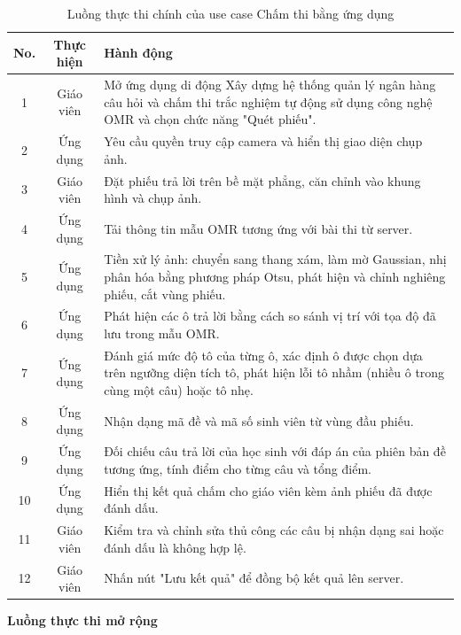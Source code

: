 ﻿\documentclass[../DoAn.tex]{subfiles}
\begin{document}
\begin{table}[H]
\centering
\begin{tabular}{|c|c|p{9cm}|}
\hline
\textbf{No.} & \textbf{Thực hiện} & \textbf{Hành động} \\ \hline
1 & Giáo viên & Mở ứng dụng di động Xây dựng hệ thống quản lý ngân hàng câu hỏi và chấm thi trắc nghiệm tự động sử dụng công nghệ OMR và chọn chức năng "Quét phiếu". \\ \hline
2 & Ứng dụng & Yêu cầu quyền truy cập camera và hiển thị giao diện chụp ảnh. \\ \hline
3 & Giáo viên & Đặt phiếu trả lời trên bề mặt phẳng, căn chỉnh vào khung hình và chụp ảnh. \\ \hline
4 & Ứng dụng & Tải thông tin mẫu OMR tương ứng với bài thi từ server. \\ \hline
5 & Ứng dụng & Tiền xử lý ảnh: chuyển sang thang xám, làm mờ Gaussian, nhị phân hóa bằng phương pháp Otsu, phát hiện và chỉnh nghiêng phiếu, cắt vùng phiếu. \\ \hline
6 & Ứng dụng & Phát hiện các ô trả lời bằng cách so sánh vị trí với tọa độ đã lưu trong mẫu OMR. \\ \hline
7 & Ứng dụng & Đánh giá mức độ tô của từng ô, xác định ô được chọn dựa trên ngưỡng diện tích tô, phát hiện lỗi tô nhầm (nhiều ô trong cùng một câu) hoặc tô nhẹ. \\ \hline
8 & Ứng dụng & Nhận dạng mã đề và mã số sinh viên từ vùng đầu phiếu. \\ \hline
9 & Ứng dụng & Đối chiếu câu trả lời của học sinh với đáp án của phiên bản đề tương ứng, tính điểm cho từng câu và tổng điểm. \\ \hline
10 & Ứng dụng & Hiển thị kết quả chấm cho giáo viên kèm ảnh phiếu đã được đánh dấu. \\ \hline
11 & Giáo viên & Kiểm tra và chỉnh sửa thủ công các câu bị nhận dạng sai hoặc đánh dấu là không hợp lệ. \\ \hline
12 & Giáo viên & Nhấn nút "Lưu kết quả" để đồng bộ kết quả lên server. \\ \hline
\end{tabular}
\caption{Luồng thực thi chính của use case Chấm thi bằng ứng dụng}
\label{table:2.3.4_main}
\end{table}
\noindent\textbf{Luồng thực thi mở rộng}
\end{document}
